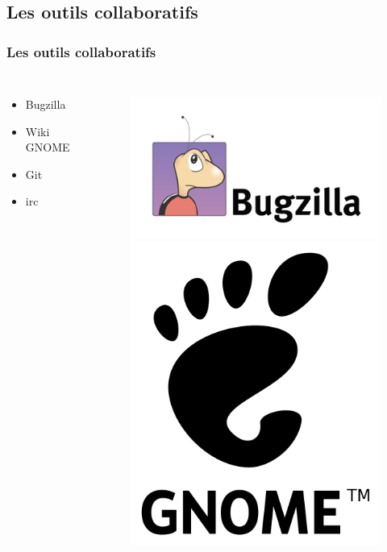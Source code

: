\documentclass{beamer}
\begin{document}
\subsection{Les outils collaboratifs}
\begin{frame}
  \frametitle{Les outils collaboratifs}
  
  \begin{columns}
    \begin{itemize}
    \item Bugzilla
    \item Wiki GNOME
    \item Git
    \item irc
    \end{itemize}
    \begin{figure}
      \includegraphics[scale=0.1]{images/bugzilla-logo.png} \\
      \includegraphics[scale=0.04]{images/gnome-logo.png} \\

\end{figure}
\end{columns}
\end{frame}
\end{document}
